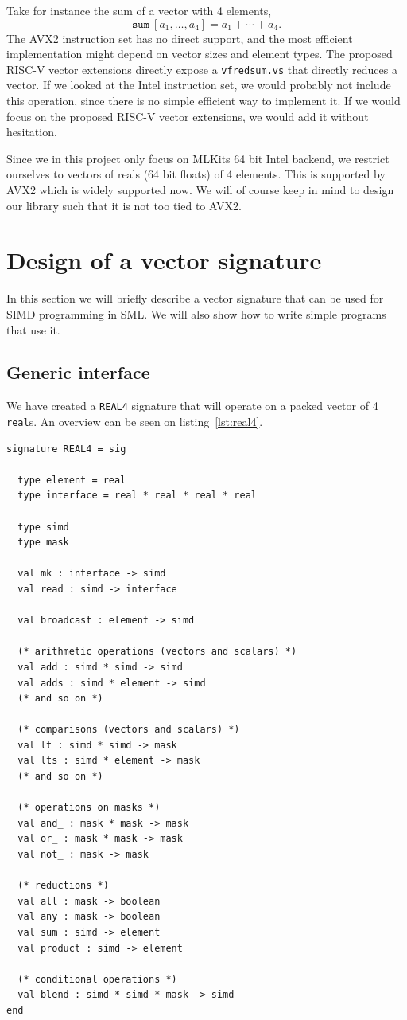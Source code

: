 \documentclass{article}
\begin{document}
Take for instance the sum of a vector with 4 elements,
\[
    \mathtt{sum}\ [a_1, \ldots, a_4] = a_1 + \cdots + a_4.
\]
The AVX2 instruction set has no direct support, and the most efficient implementation might depend on vector sizes and element types. The proposed RISC-V vector extensions directly expose a \texttt{vfredsum.vs} that directly reduces a vector. If we looked at the Intel instruction set, we would probably not include this operation, since there is no simple efficient way to implement it. If we would focus on the proposed RISC-V vector extensions, we would add it without hesitation.

Since we in this project only focus on MLKits 64 bit Intel backend, we restrict ourselves to vectors of reals (64 bit floats) of 4 elements. This is supported by AVX2 which is widely supported now. We will of course keep in mind to design our library such that it is not too tied to AVX2.

\section{Design of a vector signature}

In this section we will briefly describe a vector signature that can be used for SIMD programming in SML. We will also show how to write simple programs that use it.

\subsection{Generic interface}

We have created a \verb!REAL4! signature that will operate on a packed vector of 4 \verb!real!s. An overview can be seen on listing~\ref{lst:real4}.

\begin{lstlisting}[frame=single, caption=\texttt{REAL4} vector signature, label={lst:real4}]
signature REAL4 = sig

  type element = real
  type interface = real * real * real * real

  type simd
  type mask

  val mk : interface -> simd
  val read : simd -> interface

  val broadcast : element -> simd

  (* arithmetic operations (vectors and scalars) *)
  val add : simd * simd -> simd
  val adds : simd * element -> simd
  (* and so on *)

  (* comparisons (vectors and scalars) *)
  val lt : simd * simd -> mask
  val lts : simd * element -> mask
  (* and so on *)

  (* operations on masks *)
  val and_ : mask * mask -> mask
  val or_ : mask * mask -> mask
  val not_ : mask -> mask

  (* reductions *)
  val all : mask -> boolean
  val any : mask -> boolean
  val sum : simd -> element
  val product : simd -> element

  (* conditional operations *)
  val blend : simd * simd * mask -> simd
end
\end{lstlisting}
\end{document}
